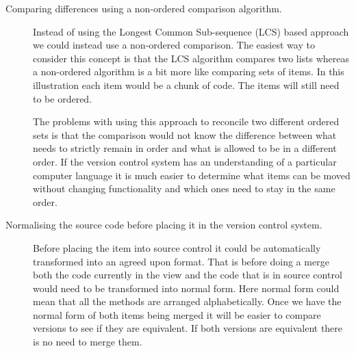 \begin{description}
  \item [Comparing differences using a non-ordered comparison algorithm.]   
    Instead of using the Longest Common Sub-sequence (LCS) based approach we could instead use a non-ordered comparison.  The easiest way to consider this concept is that the LCS algorithm compares two lists whereas a non-ordered algorithm is a bit more like comparing sets of items. In this illustration each item would be a chunk of code. The items will still need to be ordered.


    The problems with using this approach to reconcile two different ordered sets is that the comparison would not know the difference between what needs to strictly remain in order and what is allowed to be in a different order. If the version control system has an understanding of a particular computer language it is much easier to determine what items can be moved without changing functionality and which ones need to stay in the same order. 
  \item [Normalising the source code before placing it in the version control system.]
    Before placing the item into source control it could be automatically transformed into an agreed upon format. That is before doing a merge both the code currently in the view and the code that is in source control would need to be transformed into normal form.  Here normal form could mean that all the methods are arranged alphabetically.  Once we have the normal form of both items being merged it will be easier to compare versions to see if they are equivalent.  If both versions are equivalent there is no need to merge them. 


\end{description}
